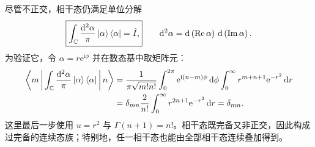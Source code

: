 尽管不正交，相干态仍满足单位分解
\begin{equation}
\boxed{\int_{\mathbb{C}}\frac{\mathrm{d}^2\alpha}{\pi}\Ket{\alpha}\Bra{\alpha}=\hat I,}
\qquad \mathrm{d}^2\alpha=\mathrm{d}\left(\operatorname{Re}\alpha\right)\,
\mathrm{d}\left(\operatorname{Im}\alpha\right).
\label{eq:coherent-resolution}
\end{equation}
为验证它，令 $\alpha=r\mathrm{e}^{\mathrm{i}\phi}$ 并在数态基中取矩阵元：
\begin{align}
\Braket{m|\int_{\mathbb{C}}\frac{\mathrm{d}^2\alpha}{\pi}\Ket{\alpha}\Bra{\alpha}|n}
&=\frac{1}{\pi\sqrt{m!n!}}
\int_0^{2\pi}\mathrm{e}^{\mathrm{i}\left(n-m\right)\phi}\,\mathrm{d}\phi
\int_0^\infty r^{m+n+1}\mathrm{e}^{-r^2}\,\mathrm{d}r\notag\\
&=\delta_{mn}\frac{2}{n!}\int_0^\infty r^{2n+1}\mathrm{e}^{-r^2}\,\mathrm{d}r
=\delta_{mn}.
\end{align}
这里最后一步使用 $u=r^2$ 与 $\Gamma\left(n+1\right)=n!$。相干态既完备又非正交，因此构成过完备的连续态族；特别地，任一相干态也能由全部相干态连续叠加得到。

